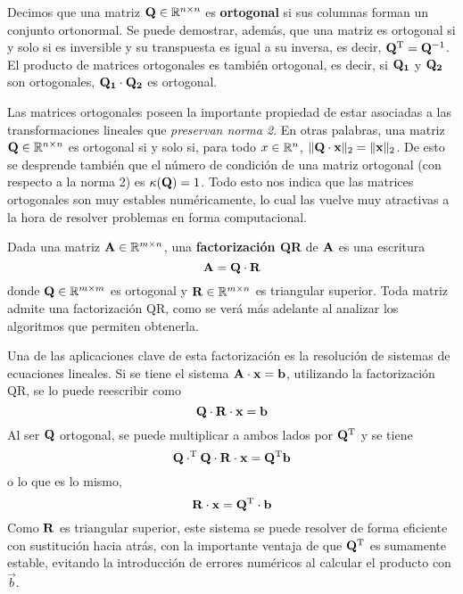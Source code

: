 Decimos que una matriz $\mathbf{Q} \in \mathbb{R}^{n \times n}$ es \textbf{ortogonal}
si sus columnas forman un conjunto ortonormal. Se puede demostrar, además, que
una matriz es ortogonal si y solo si es inversible y su transpuesta es igual a
su inversa, es decir, $\mathbf{Q}^{\mathrm{T}} = \mathbf{Q}^{-1}$. El producto de matrices
ortogonales es también ortogonal, es decir, si $\mathbf{Q_1}$ y $\mathbf{Q_2}$ son
ortogonales, $\mathbf{Q_1} \cdot \mathbf{Q_2}$ es ortogonal.

Las matrices ortogonales poseen la importante propiedad de estar asociadas a
las
transformaciones lineales que \emph{preservan norma 2}. En otras palabras, una
matriz $\mathbf{Q} \in \mathbb{R}^{n \times n}$ es ortogonal si y solo si, para todo
$x \in \mathbb{R}^n$, $\lVert \mathbf{Q} \cdot \mathbf{x} \rVert_2 =
\lVert \mathbf{x} \rVert_2$.
De esto se desprende también que el número de condición de una matriz
ortogonal (con respecto a la norma 2) es $\kappa(\mathbf{Q}) = 1$. Todo esto nos
indica que las matrices ortogonales son muy estables numéricamente, lo cual
las vuelve muy atractivas a la hora de resolver problemas en forma
computacional.


Dada una matriz $\mathbf{A} \in \mathbb{R}^{m \times n}$, una
\textbf{factorización QR} de $\mathbf{A}$ es una escritura
\[ \mathbf{A} = \mathbf{Q} \cdot \mathbf{R} \]
donde $\mathbf{Q} \in \mathbb{R}^{m \times m}$ es ortogonal y
$\mathbf{R} \in \mathbb{R}^{m \times n}$ es triangular superior. Toda matriz admite
una factorización QR, como se verá más adelante al analizar los algoritmos
que permiten obtenerla.

Una de las aplicaciones clave de esta factorización es la resolución
de sistemas de ecuaciones lineales. Si se tiene el sistema
$\mathbf{A} \cdot \mathbf{x} = \mathbf{b}$,
utilizando la factorización QR, se lo puede reescribir como
\[\mathbf{Q} \cdot \mathbf{R} \cdot \mathbf{x} = \mathbf{b}\]
Al ser $\mathbf{Q}$ ortogonal, se puede multiplicar
a ambos lados por $\mathbf{Q}^{\mathrm{T}}$ y se tiene
\[\mathbf{Q} \cdot ^{\mathrm{T}} \mathbf{Q} \cdot \mathbf{R} \cdot \mathbf{x}
    = \mathbf{Q}^{\mathrm{T}} \mathbf{b}\]
o lo que es lo mismo,
\[\mathbf{R} \cdot \mathbf{x} = \mathbf{Q}^{\mathrm{T}} \cdot \mathbf{b}\]
Como $\mathbf{R}$ es triangular superior, este sistema se puede resolver de forma
eficiente con sustitución hacia atrás, con la importante ventaja de que
$\mathbf{Q}^{\mathrm{T}}$ es sumamente estable, evitando la introducción de errores
numéricos al calcular el producto con $\vec{b}$.

